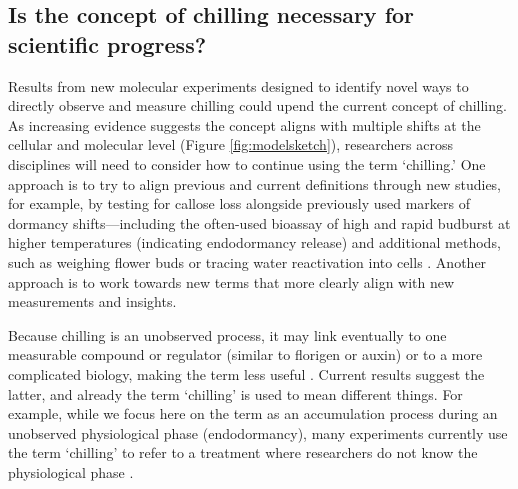 \documentclass[11pt]{article}
\begin{document}
\subsection*{Is the concept of chilling necessary for scientific progress?}  

Results from new molecular experiments designed to identify novel ways to directly observe and measure chilling could upend the current concept of chilling. As increasing evidence suggests the concept aligns with multiple shifts at the cellular and molecular level (Figure \ref{fig:modelsketch}), researchers across disciplines will need to consider how to continue using the term `chilling.' One approach is to try to align previous and current definitions through new studies,  %
for example, by testing for callose loss \citep{yu2024building} alongside previously used markers of dormancy shifts---including the often-used bioassay of high and rapid budburst at higher temperatures (indicating endodormancy release) and additional methods, such as weighing flower buds \citep{chuine2016} or tracing water reactivation into cells \citep{faust1991bound,Kalcsits2009,walde2024stable}. %
Another approach is to work towards new terms that more clearly align with new measurements and insights. 

Because chilling is an unobserved process, it may link eventually to one measurable compound or regulator (similar to florigen or auxin) or to a more complicated biology, making the term less useful \citep{aksenova2006florigen}. Current results suggest the latter, and already the term `chilling' is used to mean different things. For example, while we focus here on the term as an accumulation process during an unobserved physiological phase (endodormancy), many experiments currently use the term `chilling' to refer to a treatment where researchers do not know the physiological phase \citep[for example, cuttings or buds from woody plants are often chilled at 5\degree C for 6 weeks in the dark in a `chilling' treatment, then transferred to warm `forcing' conditions,][]{flynn2018,ospreebbms}.  
\end{document}
